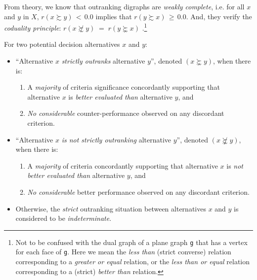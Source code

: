 From theory, we know that outranking digraphs are \emph{weakly complete}, i.e. for all $x$ and $y$ in $X$, $r(x \succsim y)\, <\, 0.0$ implies that $r(y \succsim x)\, \geqslant \, 0.0$. And, they verify the \emph{coduality principle}:  $r(x \not\succsim y) \; = \; r(y \succnsim x)$ \citep{BIS-2013}.\footnote{Not to be confused with the dual graph of a plane graph \texttt{g} that has a vertex for each face of \texttt{g}. Here we mean the \emph{less than} (strict converse) relation corresponding to a \emph{greater or equal} relation, or the \emph{less than or equal} relation corresponding to a (strict) \emph{better than} relation.}

\begin{definition}\label{def:strictOutranking}

\noindent For two potential decision alternatives $x$ and $y$:
\begin{itemize}[leftmargin=0.5cm,rightmargin=0.5cm]
\item ``Alternative $x$ \emph{strictly outranks} alternative $y$'', denoted $(x \succnsim y)$, when there is:
   \begin{enumerate}[topsep=0pt]
     \item A \emph{majority} of criteria significance concordantly supporting that alternative $x$ is \emph{better evaluated than} alternative $y$, and
     \item \emph{No considerable} counter-performance observed on any discordant criterion.      
    \end{enumerate}
\item ``Alternative $x$ \emph{is not strictly outranking} alternative $y$'', denoted $(x \not\succnsim y)$, when there is:
   \begin{enumerate}[topsep=0pt]
    \item A \emph{majority} of criteria concordantly supporting that alternative $x$ is \emph{not better evaluated than} alternative $y$, and
    \item \emph{No considerable} better performance observed on any discordant criterion. 
    \end{enumerate}
\item Otherwise, the \emph{strict} outranking situation between alternatives $x$ and $y$ is considered to be \emph{indeterminate}.
\end{itemize}
\end{definition}


